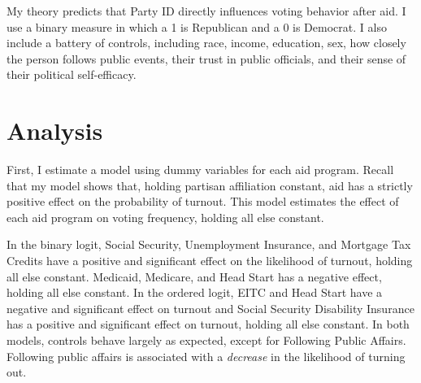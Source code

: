 \documentclass[12pt]{paper}
\begin{document}

My theory predicts that Party ID directly influences voting behavior after aid. I use a binary measure in which a 1 is Republican and a 0 is Democrat. I also include a battery of controls, including race, income, education, sex, how closely the person follows public events, their trust in public officials, and their sense of their political self-efficacy.

\section{Analysis}
First, I estimate a model using dummy variables for each aid program. Recall that my model shows that, holding partisan affiliation constant, aid has a strictly positive effect on the probability of turnout. This model estimates the effect of each aid program on voting frequency, holding all else constant.

In the binary logit, Social Security, Unemployment Insurance, and Mortgage Tax Credits have a positive and significant effect on the likelihood of turnout, holding all else constant. Medicaid, Medicare, and Head Start has a negative effect, holding all else constant. In the ordered logit, EITC and Head Start have a negative and significant effect on turnout and Social Security Disability Insurance has a positive and significant effect on turnout, holding all else constant. In both models, controls behave largely as expected, except for Following Public Affairs. Following public affairs is associated with a \textit{decrease} in the likelihood of turning out.
\end{document}
